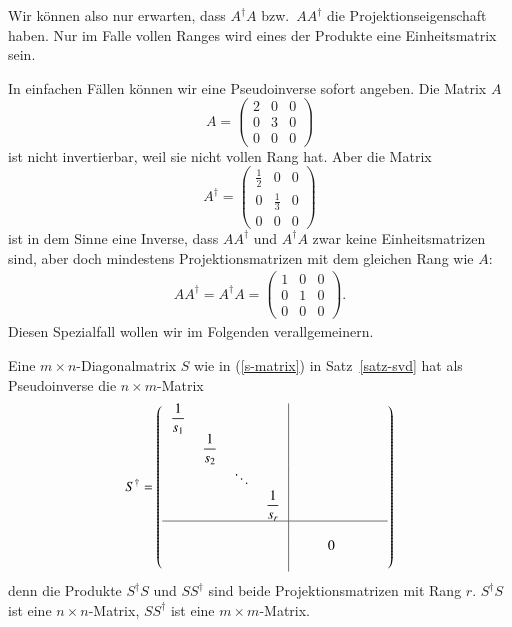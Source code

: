 Wir können also nur erwarten, dass $A^\dagger A$ bzw.~$AA^\dagger$ die
Projektionseigenschaft haben.
Nur im Falle vollen Ranges wird eines der Produkte eine Einheitsmatrix sein.

In einfachen Fällen können wir eine Pseudoinverse sofort angeben.
Die Matrix $A$
\[
A=\begin{pmatrix}
2&0&0\\
0&3&0\\
0&0&0
\end{pmatrix}
\]
ist nicht invertierbar, weil sie nicht vollen Rang hat.
Aber die Matrix
\[
A^\dagger=\begin{pmatrix}
\frac12&0&0\\
0&\frac13&0\\
0&0&0
\end{pmatrix}
\]
ist in dem Sinne eine Inverse, dass $AA^{\dagger}$ und $A^\dagger A$ zwar keine
Einheitsmatrizen sind, aber doch mindestens Projektionsmatrizen mit dem gleichen
Rang wie $A$:
\begin{align*}
AA^\dagger=A^\dagger A
=
\begin{pmatrix}
1&0&0\\
0&1&0\\
0&0&0
\end{pmatrix}.
\end{align*}
Diesen Spezialfall wollen wir im Folgenden verallgemeinern.

Eine $m\times n$-Diagonalmatrix $S$ wie in (\ref{s-matrix}) in Satz~\ref{satz-svd}
hat als Pseudoinverse die $n\times m$-Matrix
\begin{equation}
S^\dagger=\left(
\begin{tabular}{>{$\displaystyle}c<{$}>{$\displaystyle}c<{$}>{$\displaystyle}c<{$}>{$\displaystyle}c<{$}|>{$}c<{$}>{$}c<{$}>{$}c<{$}}
\frac1{s_1}&           &      &           &     &      & \\
           &\frac1{s_2}&      &           &     &      & \\
           &           &\ddots&           &     &      & \\
           &           &      &\frac1{s_r}&     &      & \\
\hline
           &           &      &           &\quad&      & \\
           &           &      &           &     &     0& \\
           &           &      &           &     &      &\qquad
\end{tabular}
\right)
\end{equation}
denn die Produkte $S^\dagger S$ und $SS^\dagger$ sind beide Projektionsmatrizen
mit Rang $r$.
$S^\dagger S$ ist eine $n\times n$-Matrix, $SS^\dagger$ ist eine
$m\times m$-Matrix.

